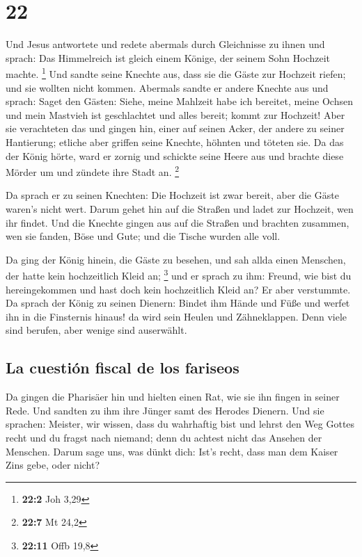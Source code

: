 \hypertarget{section-21}{%
\section{22}\label{section-21}}

 Und Jesus antwortete und redete abermals durch
Gleichnisse zu ihnen und sprach:  Das Himmelreich ist
gleich einem Könige, der seinem Sohn Hochzeit machte. \footnote{\textbf{22:2}
  Joh 3,29}  Und sandte seine Knechte aus, dass sie die
Gäste zur Hochzeit riefen; und sie wollten nicht kommen. 
Abermals sandte er andere Knechte aus und sprach: Saget den Gästen:
Siehe, meine Mahlzeit habe ich bereitet, meine Ochsen und mein Mastvieh
ist geschlachtet und alles bereit; kommt zur Hochzeit! 
Aber sie verachteten das und gingen hin, einer auf seinen Acker, der
andere zu seiner Hantierung;  etliche aber griffen seine
Knechte, höhnten und töteten sie.  Da das der König hörte,
ward er zornig und schickte seine Heere aus und brachte diese Mörder um
und zündete ihre Stadt an. \footnote{\textbf{22:7} Mt 24,2}

 Da sprach er zu seinen Knechten: Die Hochzeit ist zwar
bereit, aber die Gäste waren's nicht wert.  Darum gehet
hin auf die Straßen und ladet zur Hochzeit, wen ihr findet.
 Und die Knechte gingen aus auf die Straßen und brachten
zusammen, wen sie fanden, Böse und Gute; und die Tische wurden alle
voll.

 Da ging der König hinein, die Gäste zu besehen, und sah
allda einen Menschen, der hatte kein hochzeitlich Kleid an; \footnote{\textbf{22:11}
  Offb 19,8}  und er sprach zu ihm: Freund, wie bist du
hereingekommen und hast doch kein hochzeitlich Kleid an? Er aber
verstummte.  Da sprach der König zu seinen Dienern:
Bindet ihm Hände und Füße und werfet ihn in die Finsternis hinaus! da
wird sein Heulen und Zähneklappen.  Denn viele sind
berufen, aber wenige sind auserwählt.

\hypertarget{la-cuestiuxf3n-fiscal-de-los-fariseos}{%
\subsection{La cuestión fiscal de los
fariseos}\label{la-cuestiuxf3n-fiscal-de-los-fariseos}}

 Da gingen die Pharisäer hin und hielten einen Rat, wie
sie ihn fingen in seiner Rede.  Und sandten zu ihm ihre
Jünger samt des Herodes Dienern. Und sie sprachen: Meister, wir wissen,
dass du wahrhaftig bist und lehrst den Weg Gottes recht und du fragst
nach niemand; denn du achtest nicht das Ansehen der Menschen.
 Darum sage uns, was dünkt dich: Ist's recht, dass man
dem Kaiser Zins gebe, oder nicht?


